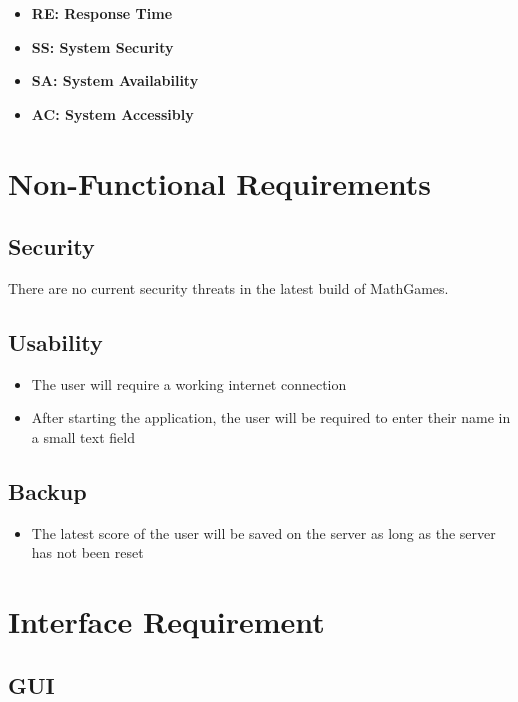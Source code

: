 \documentclass[12pt]{article}
\begin{document}
\begin{itemize}

\item \textbf{RE: Response Time}
\item \textbf{SS: System Security}
\item \textbf{SA: System Availability}
\item \textbf{AC: System Accessibly}

\end{itemize}

\newpage

\section{Non-Functional Requirements}

\subsection{Security}

There are no current security threats in the latest build of MathGames.

\subsection{Usability}

\begin{itemize}
\item The user will require a working internet connection
\item After starting the application, the user will be required to enter their name in a small text field
\end{itemize}

\subsection{Backup}

\begin{itemize}
\item The latest score of the user will be saved on the server as long as the server has not been reset
\end{itemize}


\section{Interface Requirement}

\subsection{GUI}
\end{document}
